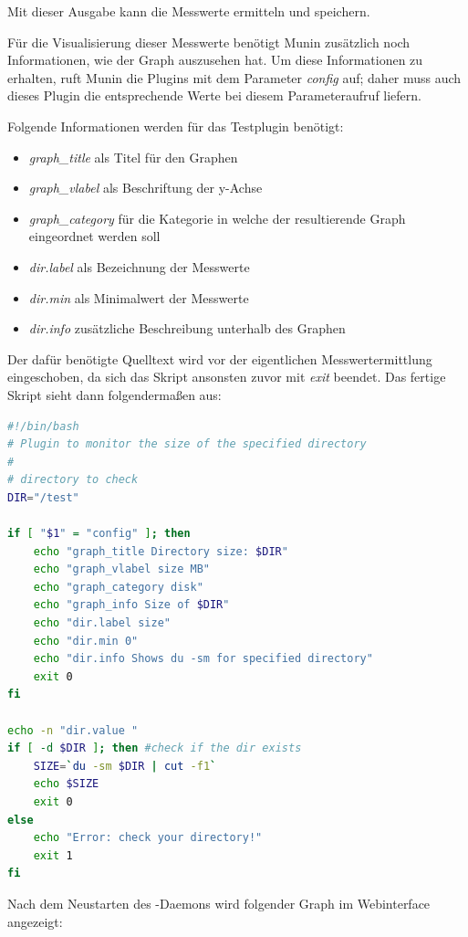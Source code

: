 Mit dieser Ausgabe kann  die Messwerte ermitteln und speichern.

Für die Visualisierung dieser Messwerte benötigt Munin zusätzlich noch Informationen, wie der Graph auszusehen hat.
Um diese Informationen zu erhalten, ruft Munin die Plugins mit dem Parameter \textit{config} auf; daher muss auch dieses Plugin die entsprechende Werte bei diesem Parameteraufruf liefern.

Folgende Informationen werden für das Testplugin benötigt:

\begin{itemize}
\item \textit{graph\_title} als Titel für den Graphen
\item \textit{graph\_vlabel} als Beschriftung der y-Achse
\item \textit{graph\_category} für die Kategorie in welche der resultierende Graph eingeordnet werden soll
\item \textit{dir.label} als Bezeichnung der Messwerte
\item \textit{dir.min} als Minimalwert der Messwerte
\item \textit{dir.info} zusätzliche Beschreibung unterhalb des Graphen
\end{itemize}

Der dafür benötigte Quelltext wird vor der eigentlichen Messwertermittlung eingeschoben, da sich das Skript ansonsten zuvor mit \textit{exit} beendet.
Das fertige Skript sieht dann folgendermaßen aus:

\begin{lstlisting}[captionpos=b, caption=Fertiges Skript für den Speicherplatzbedarf eines Verzeichnisses, label=du, breaklines = true, language=bash]
#!/bin/bash
# Plugin to monitor the size of the specified directory
#
# directory to check
DIR="/test"

if [ "$1" = "config" ]; then
	echo "graph_title Directory size: $DIR"
	echo "graph_vlabel size MB"
	echo "graph_category disk"
	echo "graph_info Size of $DIR"
	echo "dir.label size"
	echo "dir.min 0"
	echo "dir.info Shows du -sm for specified directory"
	exit 0
fi

echo -n "dir.value "
if [ -d $DIR ]; then #check if the dir exists
    SIZE=`du -sm $DIR | cut -f1`
    echo $SIZE
    exit 0
else
    echo "Error: check your directory!"
    exit 1
fi
\end{lstlisting}

Nach dem Neustarten des -Daemons wird folgender Graph im Webinterface angezeigt:

